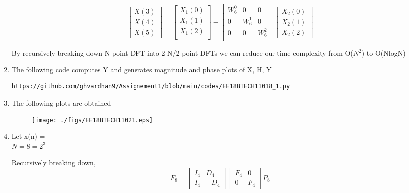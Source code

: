 \documentclass[journal,12pt,twocolumn]{IEEEtran}
\renewcommand\thesection{\arabic{section}}
\begin{document}
\begin{enumerate}[label=\thesection.\arabic*.,ref=\thesection.\theenumi]
\begin{equation}
\begin{bmatrix}
X(3) \\ 
X(4) \\ 
X(5) 
\end{bmatrix}
=
\begin{bmatrix}
X_{1}(0) \\ 
X_{1}(1)\\ 
X_{1}(2)\\
\end{bmatrix}
-
\begin{bmatrix}
W^{0}_{6} & 0 & 0\\
0 & W^{1}_{6} & 0\\
0 & 0 & W^{2}_{6}\\
\end{bmatrix}
\begin{bmatrix}
X_{2}(0) \\ 
X_{2}(1) \\ 
X_{2}(2)
\end{bmatrix} 
\end{equation}

By recursively breaking down N-point DFT into 2 N/2-point DFTs we can reduce our time complexity from O($N^{2}$) to O(NlogN)

\item The following code computes Y and generates magnitude and phase plots of X, H, Y
\begin{lstlisting}
https://github.com/ghvardhan9/Assignement1/blob/main/codes/EE18BTECH11018_1.py
\end{lstlisting}

\item The following plots are obtained
\begin{figure}[!ht]
	\texttt{[image: ./figs/EE18BTECH11021.eps]}
\end{figure}

\item Let x(n) = 
         \label{eq:equation0}\\
$N = 8 = 2^3$

Recursively breaking down,
\begin{equation}
F_{8}=
\begin{bmatrix}
I_{4} & D_{4} \\
I_{4} & -D_{4}
\end{bmatrix}
\begin{bmatrix}
F_{4} & 0 \\
0 & F_{4}
\end{bmatrix}
P_{8}
\end{equation}


\end{enumerate}
\end{document}
